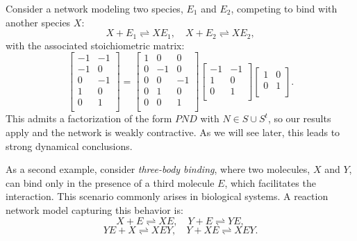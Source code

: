 \documentclass{article}
\begin{document}
Consider a network modeling two species, $E_1$ and $E_2$, competing to bind with another species $X$:
\[
X + E_1 \rightleftharpoons XE_1, \quad X + E_2 \rightleftharpoons XE_2,
\]
with the associated stoichiometric matrix:
\[
\begin{bmatrix}
    -1 & -1 \\
    -1 & 0 \\
    0 & -1 \\
    1 & 0 \\
    0 & 1 \\
\end{bmatrix}
= 
\begin{bmatrix}
    1 & 0 & 0 \\
    0 & -1 & 0 \\
    0 & 0 & -1 \\
    0 & 1 & 0 \\
    0 & 0 & 1 \\
\end{bmatrix}
\begin{bmatrix}
    -1 & -1 \\
    1 & 0 \\
    0 & 1 \\
\end{bmatrix}
\begin{bmatrix}
    1 & 0 \\
    0 & 1 \\
\end{bmatrix}.
\]
This admits a factorization of the form $PND$ with $N \in S \cup S^t$, so our results apply and the network is weakly contractive. As we will see later, this leads to strong dynamical conclusions.

As a second example, consider \textit{three-body binding}, where two molecules, $X$ and $Y$, can bind only in the presence of a third molecule $E$, which facilitates the interaction. This scenario commonly arises in biological systems. A reaction network model capturing this behavior is:
\[
X + E \rightleftharpoons XE, \quad Y + E \rightleftharpoons YE,
\]
\[
YE + X \rightleftharpoons XEY, \quad Y + XE \rightleftharpoons XEY.
\]
\end{document}
